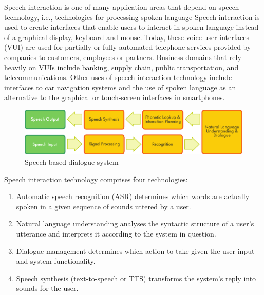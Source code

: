 \documentclass[]{../../metanetpaper}
\begin{document}
\begin{multicols}{2}
Speech interaction is one of many application areas that depend on speech
technology, i.e., technologies for processing spoken language Speech
interaction is used to create interfaces that enable users to interact in
spoken language instead of a graphical display, keyboard and mouse. Today,
these voice user interfaces (VUI) are used for partially or fully automated
telephone services provided by companies to customers, employees or
partners. Business domains that rely heavily on VUIs include banking, supply
chain, public transportation, and telecommunications. Other uses of speech
interaction technology include interfaces to car navigation systems and the
use of spoken language as an alternative to the graphical or touch-screen
interfaces in smartphones. 



\begin{figure}[htb]
  \center
  \includegraphics[width=\textwidth]{../_media/english/simple_speech-based_dialogue_architecture}
  \caption{Speech-based dialogue system}
  \label{fig:dialoguearch_en}
\end{figure}

Speech interaction technology comprises four technologies: 


\begin{enumerate}
\item Automatic \underline{speech recognition} (ASR) determines which words are actually spoken in a given sequence of sounds uttered by a user.
\item Natural language understanding analyses the syntactic structure of a user's utterance and interprets it according to the system in question.
\item Dialogue management determines which action to take given the user input and system functionality.
\item \underline{Speech synthesis} (text-to-speech or TTS) transforms the
  system's reply into sounds for the user.
\end{enumerate}


\end{multicols}
\end{document}

